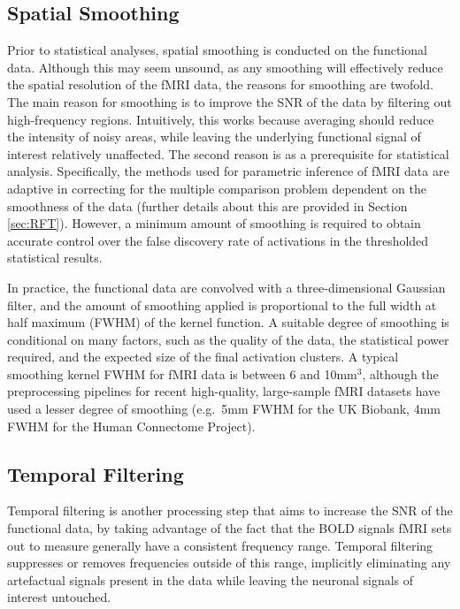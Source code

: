 \subsection{Spatial Smoothing}

Prior to statistical analyses, spatial smoothing is conducted on the functional data. Although this may seem unsound, as any smoothing will effectively reduce the spatial resolution of the fMRI data, the reasons for smoothing are twofold. The  main reason for smoothing is to improve the SNR of the data by filtering out high-frequency regions. Intuitively, this works because averaging should reduce the intensity of noisy areas, while leaving the underlying functional signal of interest relatively unaffected. The second reason is as a prerequisite for statistical analysis. Specifically, the methods used for parametric inference of fMRI data are adaptive in correcting for the multiple comparison problem dependent on the smoothness of the data (further details about this are provided in Section \ref{sec:RFT}). However, a minimum amount of smoothing is required to obtain accurate control over the false discovery rate of activations in the thresholded statistical results.

In practice, the functional data are convolved with a three-dimensional Gaussian filter, and the amount of smoothing applied is proportional to the full width at half maximum (FWHM) of the kernel function. A suitable degree of smoothing is conditional on many factors, such as the quality of the data, the statistical power required, and the expected size of the final activation clusters. A typical smoothing kernel FWHM for fMRI data is between 6 and 10mm$^{3}$, although the preprocessing pipelines for recent high-quality, large-sample fMRI datasets have used a lesser degree of smoothing (e.g.\ 5mm FWHM for the UK Biobank, 4mm FWHM for the Human Connectome Project). 
 

\subsection{Temporal Filtering}
\label{sec:temporal_filtering}

Temporal filtering is another processing step that aims to increase the SNR of the functional data, by taking advantage of the fact that the BOLD signals fMRI sets out to measure generally have a consistent frequency range. Temporal filtering suppresses or removes frequencies outside of this range, implicitly eliminating any artefactual signals present in the data while leaving the neuronal signals of interest untouched.

